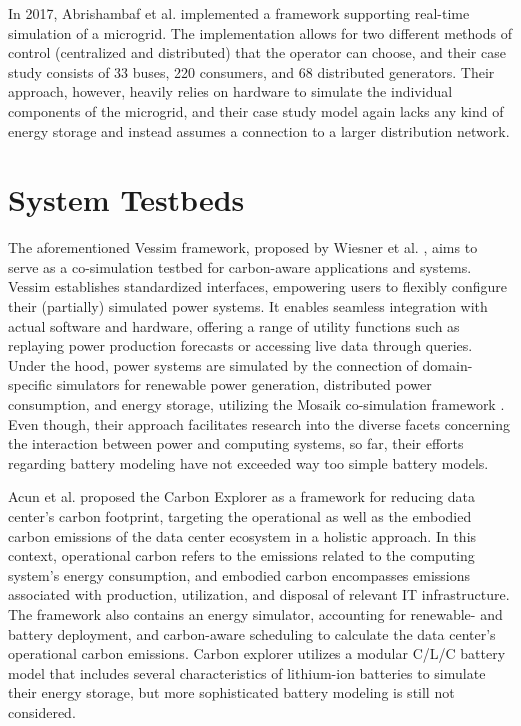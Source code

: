 In 2017, Abrishambaf et al. \cite{abrishambaf2017implementation} implemented a framework supporting real-time simulation of a microgrid. The implementation allows for two different methods of control (centralized and distributed) that the operator can choose, and their case study consists of 33 buses, 220 consumers, and 68 distributed generators. Their approach, however, heavily relies on hardware to simulate the individual components of the microgrid, and their case study model again lacks any kind of energy storage and instead assumes a connection to a larger distribution network.

\section{System Testbeds}
\label{system_testbeds}
The aforementioned Vessim framework, proposed by Wiesner et al. \cite{vessim}, aims to serve as a co-simulation testbed for carbon-aware applications and systems. Vessim establishes standardized interfaces, empowering users to flexibly configure their (partially) simulated power systems. It enables seamless integration with actual software and hardware, offering a range of utility functions such as replaying power production forecasts or accessing live data through queries. Under the hood, power systems are simulated by the connection of domain-specific simulators for renewable power generation, distributed power consumption, and energy storage, utilizing the Mosaik co-simulation framework \cite{mosaik}. Even though, their approach facilitates research into the diverse facets concerning the interaction between power and computing systems, so far, their efforts regarding battery modeling have not exceeded way too simple battery models.

Acun et al. \cite{acun2022holistic} proposed the Carbon Explorer as a framework for reducing data center's carbon footprint, targeting the operational as well as the embodied carbon emissions of the data center ecosystem in a holistic approach. In this context, operational carbon refers to the emissions related to the computing system's energy consumption, and embodied carbon encompasses emissions associated with production, utilization, and disposal of relevant IT infrastructure. The framework also contains an energy simulator, accounting for renewable- and battery deployment, and carbon-aware scheduling to calculate the data center's operational carbon emissions. Carbon explorer utilizes a modular C/L/C battery model that includes several characteristics of lithium-ion batteries to simulate their energy storage, but more sophisticated battery modeling is still not considered.

